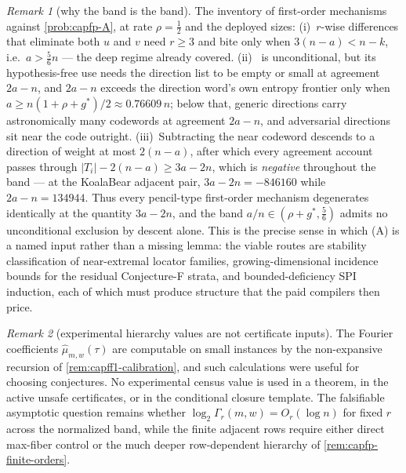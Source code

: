 \documentclass[11pt]{article}
\theoremstyle{definition}
\theoremstyle{remark}
\newtheorem{remark}[remark]{Remark}
\begin{document}
\begin{remark}[why the band is the band]\label{rem:capfp-band-obstruction}
The inventory of first-order mechanisms against \cref{prob:capfp-A}, at rate $\rho=\tfrac12$ and the deployed sizes:
\textup{(i)}\ $r$-wise differences that eliminate both $u$ and $v$ need $r\ge3$ and bite only when $3(n-a)<n-k$, i.e.\ $a>\tfrac56n$ --- the deep regime already covered.
\textup{(ii)}\  is unconditional, but its hypothesis-free use needs the direction list to be empty or small at agreement $2a-n$, and $2a-n$ exceeds the direction word's own entropy frontier only when $a\ge n(1+\rho+g^*)/2\approx0.76609\,n$; below that, generic directions carry astronomically many codewords at agreement $2a-n$, and adversarial directions sit near the code outright.
\textup{(iii)}\ Subtracting the near codeword descends to a direction of weight at most $2(n-a)$, after which every agreement account passes through $|T_i|-2(n-a)\ge3a-2n$, which is \emph{negative} throughout the band --- at the KoalaBear adjacent pair, $3a-2n=-846160$ while $2a-n=134944$.
Thus every pencil-type first-order mechanism degenerates identically at the quantity $3a-2n$, and the band $a/n\in(\rho+g^*,\tfrac56)$ admits no unconditional exclusion by descent alone.  This is the precise sense in which \textup{(A)} is a named input rather than a missing lemma: the viable routes are stability classification of near-extremal locator families, growing-dimensional incidence bounds for the residual Conjecture-F strata, and bounded-deficiency SPI induction, each of which must produce structure that the paid compilers then price.
\end{remark}

\begin{remark}[experimental hierarchy values are not certificate inputs]\label{rem:capfp-gamma-measured}
The Fourier coefficients $\widehat\mu_{m,w}(\tau)$ are computable on small instances by the non-expansive recursion of \cref{rem:capff1-calibration}, and such calculations were useful for choosing conjectures.  No experimental census value is used in a theorem, in the active unsafe certificates, or in the conditional closure template.  The falsifiable asymptotic question remains whether $\log_2\Gamma_r(m,w)=O_r(\log n)$ for fixed $r$ across the normalized band, while the finite adjacent rows require either direct max-fiber control or the much deeper row-dependent hierarchy of \cref{rem:capfp-finite-orders}.
\end{remark}
\end{document}
